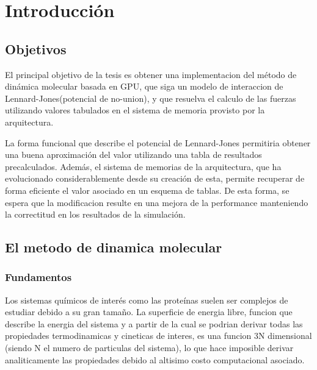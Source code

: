 \documentclass[a4paper,10pt]{report}
\begin{document}
\pagebreak




\tableofcontents

\pagebreak


\chapter{Introducción}


\section{Objetivos}



El principal objetivo de la tesis es obtener una implementacion del método de dinámica molecular basada en GPU, que siga un modelo de interaccion de 
Lennard-Jones(potencial de no-union), y que resuelva el calculo de las fuerzas utilizando valores tabulados en el sistema de memoria provisto por la arquitectura. 

La forma funcional que describe el potencial de Lennard-Jones permitiria obtener una buena aproximación del valor utilizando una tabla de resultados precalculados. 
Además, el sistema de memorias de la arquitectura, que ha evolucionado considerablemente desde su creación de esta, permite recuperar de forma eficiente el valor asociado en un esquema de tablas. 
De esta forma, se espera que la modificacion resulte en una mejora de la performance manteniendo la correctitud en los resultados de la simulación. 



\section{El metodo de dinamica molecular}

\subsection{Fundamentos}


Los sistemas químicos de interés como las proteínas suelen ser complejos de estudiar debido a su gran tamaño. 
La superficie de energia libre, funcion que describe la energia del sistema y a partir de la cual se podrian derivar todas las propiedades termodinamicas y cineticas de interes, es una funcion 3N dimensional (siendo N el numero de particulas del sistema), lo que hace imposible derivar analiticamente las propiedades debido al altisimo costo computacional asociado.
\end{document}
